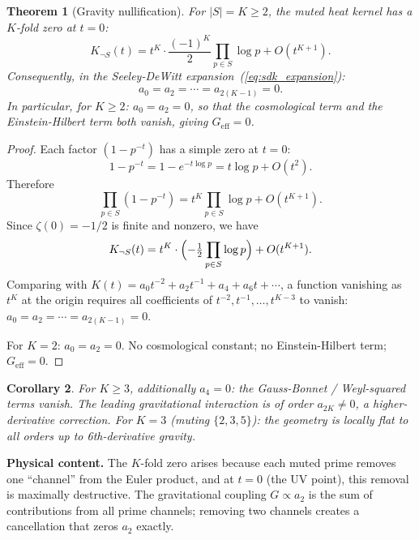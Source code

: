 \documentclass[aps,prd,twocolumn,superscriptaddress,nofootinbib]{revtex4-2}
\newtheorem{theorem}{Theorem}
\newtheorem{corollary}[theorem]{Corollary}
\begin{document}
\begin{theorem}[Gravity nullification]
\label{thm:nullification}
For $|S| = K \geq 2$, the muted heat kernel has a $K$-fold zero at
$t = 0$:
\begin{equation}
  K_{\neg S}(t) = t^K \cdot \frac{(-1)^K}{2}
  \prod_{p \in S}\log p + O(t^{K+1}).
\end{equation}
Consequently, in the Seeley-DeWitt expansion~(\ref{eq:sdk_expansion}):
\begin{equation}
  a_0 = a_2 = \cdots = a_{2(K-1)} = 0.
\end{equation}
In particular, for $K \geq 2$: $a_0 = a_2 = 0$, so that the
cosmological term and the Einstein-Hilbert term both vanish,
giving $G_{\mathrm{eff}} = 0$.
\end{theorem}

\begin{proof}
Each factor $(1 - p^{-t})$ has a simple zero at $t = 0$:
\begin{equation}
  1 - p^{-t} = 1 - e^{-t\log p} = t\log p + O(t^2).
\end{equation}
Therefore
\begin{equation}
  \prod_{p \in S}(1 - p^{-t}) = t^K \prod_{p\in S}\log p + O(t^{K+1}).
\end{equation}
Since $\zeta(0) = -1/2$ is finite and nonzero, we have
\begin{equation}
  K_{\neg S}(t) = t^K \cdot \Bigl(-\tfrac{1}{2}\prod_{p\in S}\log p\Bigr)
  + O(t^{K+1}).
\end{equation}
Comparing with $K(t) = a_0 t^{-2} + a_2 t^{-1} + a_4 + a_6 t + \cdots$,
a function vanishing as $t^K$ at the origin requires all coefficients
of $t^{-2}, t^{-1}, \ldots, t^{K-3}$ to vanish:
$a_0 = a_2 = \cdots = a_{2(K-1)} = 0$.

For $K = 2$: $a_0 = a_2 = 0$.
No cosmological constant; no Einstein-Hilbert term;
$G_{\mathrm{eff}} = 0$.
\end{proof}

\begin{corollary}
For $K \geq 3$, additionally $a_4 = 0$:
the Gauss-Bonnet / Weyl-squared terms vanish.
The leading gravitational interaction is of order $a_{2K} \neq 0$,
a higher-derivative correction.
For $K = 3$ (muting $\{2,3,5\}$): the geometry is locally flat
to all orders up to 6th-derivative gravity.
\end{corollary}

\textbf{Physical content.}
The $K$-fold zero arises because each muted prime removes one
``channel'' from the Euler product, and at $t = 0$ (the UV point),
this removal is maximally destructive.
The gravitational coupling $G \propto a_2$ is the sum of
contributions from all prime channels;
removing two channels creates a cancellation that zeros $a_2$ exactly.
\end{document}
